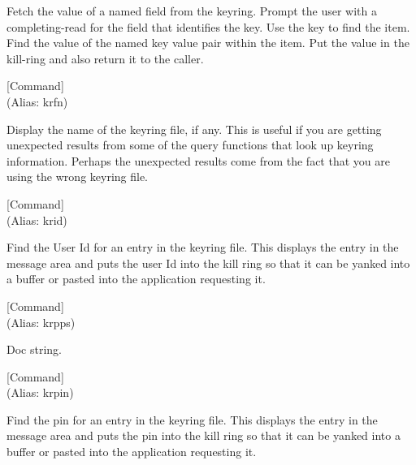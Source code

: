 \begin{doc-string}
Fetch the value of a named field from the keyring.  Prompt the user with a completing-read
for the field that identifies the key.  Use the key to find the item.  Find the value of the named
key value pair within the item.  Put the value in the kill-ring and also return it to the caller.
\end{doc-string}

\vspace{1em}
\noindent
{}
\usebox{\funcname}
 \hfill [Command]\\%
 (Alias: krfn)

\begin{doc-string}
Display the name of the keyring file, if any.  This is useful if you are
getting unexpected results from some of the query functions that look up keyring
information.  Perhaps the unexpected results come from the fact that you are
using the wrong keyring file.
\end{doc-string}

\vspace{1em}
\noindent
{}
\usebox{\funcname}
 \hfill [Command]\\%
 (Alias: krid)

\begin{doc-string}
Find the User Id for an entry in the keyring file.  This displays the entry
in the message area and puts the user Id into the kill ring so that it can be
yanked into a buffer or pasted into the application requesting it.
\end{doc-string}

\vspace{1em}
\noindent
{}
\usebox{\funcname}
 \hfill [Command]\\%
 (Alias: krpps)

\begin{doc-string}
Doc string.
\end{doc-string}

\vspace{1em}
\noindent
{}
\usebox{\funcname}
 \hfill [Command]\\%
 (Alias: krpin)

\begin{doc-string}
Find the pin for an entry in the keyring file.  This displays the entry in
the message area and puts the pin into the kill ring so that it can be yanked
into a buffer or pasted into the application requesting it.
\end{doc-string}


